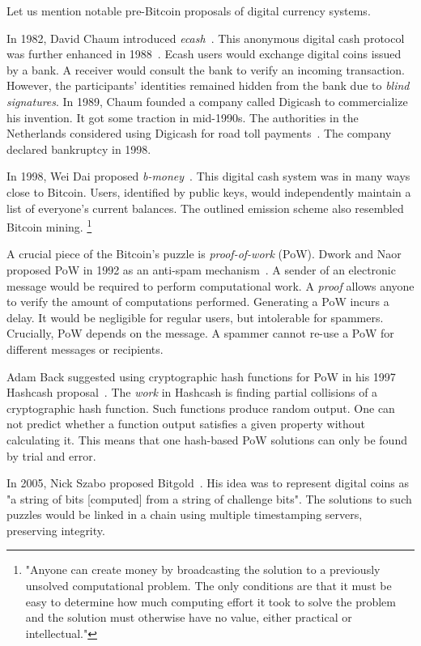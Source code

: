 Let us mention notable pre-Bitcoin proposals of digital currency systems.

In 1982, David Chaum introduced \textit{ecash}~\cite{Chaum1982}.
This anonymous digital cash protocol was further enhanced in 1988~\cite{Chaum1988}.
Ecash users would exchange digital coins issued by a bank.
A receiver would consult the bank to verify an incoming transaction.
However, the participants' identities remained hidden from the bank due to \textit{blind signatures}.
In 1989, Chaum founded a company called Digicash to commercialize his invention.
It got some traction in mid-1990s.
The authorities in the Netherlands considered using Digicash for road toll payments~\cite{Chaum2019}.
The company declared bankruptcy in 1998.

In 1998, Wei Dai proposed \textit{b-money}~\cite{Dai1998}.
This digital cash system was in many ways close to Bitcoin.
Users, identified by public keys, would independently maintain a list of everyone's current balances.
The outlined emission scheme also resembled Bitcoin mining.
\footnote{"Anyone can create money by broadcasting the solution to a previously unsolved computational problem. The only conditions are that it must be easy to determine how much computing effort it took to solve the problem and the solution must otherwise have no value, either practical or intellectual."}

A crucial piece of the Bitcoin's puzzle is \textit{proof-of-work} (PoW).
Dwork and Naor proposed PoW in 1992 as an anti-spam mechanism~\cite{Dwork1992}.
A sender of an electronic message would be required to perform computational work.
A \textit{proof} allows anyone to verify the amount of computations performed.
Generating a PoW incurs a delay.
It would be negligible for regular users, but intolerable for spammers.
Crucially, PoW depends on the message.
A spammer cannot re-use a PoW for different messages or recipients.

Adam Back suggested using cryptographic hash functions for PoW in his 1997 Hashcash proposal~\cite{Back1997}.
The \textit{work} in Hashcash is finding partial collisions of a cryptographic hash function.
Such functions produce random output.
One can not predict whether a function output satisfies a given property without calculating it.
This means that one hash-based PoW solutions can only be found by trial and error.

In 2005, Nick Szabo proposed Bitgold~\cite{Szabo2005}.
His idea was to represent digital coins as "a string of bits [computed] from a string of challenge bits".
The solutions to such puzzles would be linked in a chain using multiple timestamping servers, preserving integrity.


